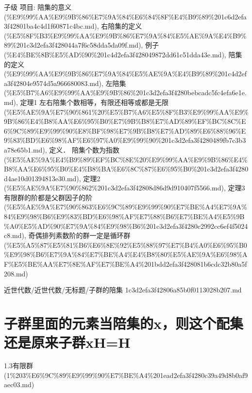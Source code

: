 \begin{note}[子群的陪集]

子级 项目: 陪集的意义 (\%E9\%99\%AA\%E9\%9B\%86\%E7\%9A\%84\%E6\%84\%8F\%E4\%B9\%89\%201c6d2efa3f42801ba4c4d1f60871c4bc.md), 右陪集的定义 (\%E5\%8F\%B3\%E9\%99\%AA\%E9\%9B\%86\%E7\%9A\%84\%E5\%AE\%9A\%E4\%B9\%89\%201c3d2efa3f428044a7f6c58dda5da09f.md), 例子 (\%E4\%BE\%8B\%E5\%AD\%90\%201c4d2efa3f428049872dd61c51dda43e.md), 陪集的定义 (\%E9\%99\%AA\%E9\%9B\%86\%E7\%9A\%84\%E5\%AE\%9A\%E4\%B9\%89\%201c4d2efa3f42804e9574d5a966680083.md), 左陪集 (\%E5\%B7\%A6\%E9\%99\%AA\%E9\%9B\%86\%201c3d2efa3f4280bebcadc5fc4efa6e1e.md), 定理1 左右陪集个数相等，有限还相等或都是无限 (\%E5\%AE\%9A\%E7\%90\%861\%20\%E5\%B7\%A6\%E5\%8F\%B3\%E9\%99\%AA\%E9\%9B\%86\%E4\%B8\%AA\%E6\%95\%B0\%E7\%9B\%B8\%E7\%AD\%89\%EF\%BC\%8C\%E6\%9C\%89\%E9\%99\%90\%E8\%BF\%98\%E7\%9B\%B8\%E7\%AD\%89\%E6\%88\%96\%E9\%83\%BD\%E6\%98\%AF\%E6\%97\%A0\%E9\%99\%90\%201c3d2efa3f4280489fb7c3b3a78e65b1.md), 定义． 陪集个数为指数 (\%E5\%AE\%9A\%E4\%B9\%89\%EF\%BC\%8E\%20\%E9\%99\%AA\%E9\%9B\%86\%E4\%B8\%AA\%E6\%95\%B0\%E4\%B8\%BA\%E6\%8C\%87\%E6\%95\%B0\%201c3d2efa3f4280d4ae10d01394813e30.md), 定理2 (\%E5\%AE\%9A\%E7\%90\%862\%201c3d2efa3f42808d86d9d910407f5566.md), 定理3有限群的阶都是父群因子的阶 (\%E5\%AE\%9A\%E7\%90\%863\%E6\%9C\%89\%E9\%99\%90\%E7\%BE\%A4\%E7\%9A\%84\%E9\%98\%B6\%E9\%83\%BD\%E6\%98\%AF\%E7\%88\%B6\%E7\%BE\%A4\%E5\%9B\%A0\%E5\%AD\%90\%E7\%9A\%84\%E9\%98\%B6\%201c3d2efa3f4280c2992cc6ef4f5024c8.md), 奇偶排列素数阶的群一定是循环群 (\%E5\%A5\%87\%E5\%81\%B6\%E6\%8E\%92\%E5\%88\%97\%E7\%B4\%A0\%E6\%95\%B0\%E9\%98\%B6\%E7\%9A\%84\%E7\%BE\%A4\%E4\%B8\%80\%E5\%AE\%9A\%E6\%98\%AF\%E5\%BE\%AA\%E7\%8E\%AF\%E7\%BE\%A4\%201bdd2efa3f428081b6cdc32b80a5f208.md)

\end{note}

\begin{note}[来源路径]

近世代数/近世代数/无标题/子群的陪集 1c3d2efa3f42806a85b0f0113028b207.md

\end{note}

\section*{子群里面的元素当陪集的x，则这个配集还是原来子群xH=H}

\begin{note}[来源上级主题]

1.3有限群 (1\%203\%E6\%9C\%89\%E9\%99\%90\%E7\%BE\%A4\%201ead2efa3f4280c39a49d8b0af9aec03.md)

\end{note}

